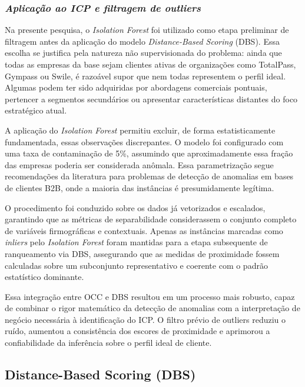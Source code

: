 \subsubsection{\textit{Aplicação ao ICP e filtragem de outliers}}

Na presente pesquisa, o \textit{Isolation Forest} foi utilizado como
etapa preliminar de filtragem antes da aplicação do modelo
\textit{Distance-Based Scoring} (DBS). Essa escolha se justifica pela
natureza não supervisionada do problema: ainda que todas as empresas da
base sejam clientes ativas de organizações como TotalPass, Gympass ou
Swile, é razoável supor que nem todas representem o perfil ideal.
Algumas podem ter sido adquiridas por abordagens comerciais pontuais,
pertencer a segmentos secundários ou apresentar características
distantes do foco estratégico atual.

A aplicação do \textit{Isolation Forest} permitiu excluir, de forma
estatisticamente fundamentada, essas observações discrepantes. O modelo
foi configurado com uma taxa de contaminação de 5\%, assumindo que
aproximadamente essa fração das empresas poderia ser considerada
anômala. Essa parametrização segue recomendações da literatura para
problemas de detecção de anomalias em bases de clientes B2B, onde a
maioria das instâncias é presumidamente legítima.

O procedimento foi conduzido sobre os dados já vetorizados e escalados,
garantindo que as métricas de separabilidade considerassem o conjunto
completo de variáveis firmográficas e contextuais. Apenas as instâncias
marcadas como \textit{inliers} pelo \textit{Isolation Forest} foram
mantidas para a etapa subsequente de ranqueamento via DBS, assegurando
que as medidas de proximidade fossem calculadas sobre um subconjunto
representativo e coerente com o padrão estatístico dominante.

Essa integração entre OCC e DBS resultou em um processo mais robusto,
capaz de combinar o rigor matemático da detecção de anomalias com a
interpretação de negócio necessária à identificação do ICP. O filtro
prévio de outliers reduziu o ruído, aumentou a consistência dos escores
de proximidade e aprimorou a confiabilidade da inferência sobre o perfil
ideal de cliente.




\subsection{\textbf{Distance-Based Scoring (DBS)}}

